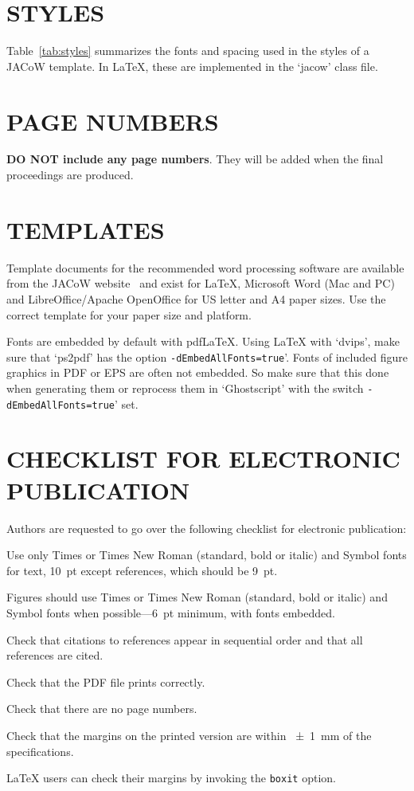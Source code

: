 \documentclass[a4paper,
               nospread,     %
               ]{jacow}
\begin{document}
\section{STYLES}

Table~\ref{tab:styles} summarizes the fonts and spacing used in the styles of
a JACoW template. In \LaTeX, these 
are implemented in the ‘jacow’ class file.

\section{PAGE NUMBERS}

\textbf{DO NOT include any page numbers}. They will be added
when the final proceedings are produced.

\section{TEMPLATES}

Template documents for the recommended word processing
software are available from the JACoW website~\cite{jacow-help}
and exist for \LaTeX, Microsoft Word (Mac and PC)
and LibreOffice/Apache OpenOffice for US letter and A4
paper sizes. Use the correct template for your paper size and
platform.

Fonts are embedded by default with pdf\LaTeX. Using \LaTeX{} with `dvips', 
make sure that `ps2pdf' has the option \texttt{-dEmbedAllFonts=true}'.
Fonts of included figure graphics in PDF or EPS are often not embedded. 
So make sure that this done when generating them or reprocess them 
in `Ghostscript' with the switch \texttt{-dEmbedAllFonts=true}' set.

\flushcolsend

\section{CHECKLIST FOR ELECTRONIC PUBLICATION}
Authors are requested to go over the following checklist for electronic publication:
\begin{Itemize}
	\item  Use only Times or Times New Roman (standard, bold or italic) and Symbol
	fonts for text, \SI{10}{pt} except references, which should be \SI{9}{pt}.
	
	\item  Figures should use Times or Times New Roman (standard, bold or italic) and
	Symbol fonts when possible---\SI{6}{pt} minimum, with fonts embedded.
	\item  Check that citations to references appear in sequential order and
	that all references are cited.
	\item  Check that the PDF file prints correctly.
	\item  Check that there are no page numbers.
	\item  Check that the margins on the printed version are within \SI{\pm1}{mm}
	of the specifications.
	\item  \LaTeX{} users can check their margins by invoking the
	\texttt{boxit} option.
\end{Itemize}
\end{document}
